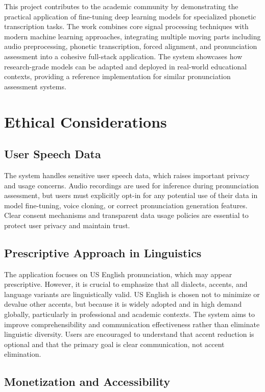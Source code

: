 \documentclass[a4paper,12pt]{report}
\begin{document}
This project contributes to the academic community by demonstrating the practical application of fine-tuning deep learning models for specialized phonetic transcription tasks. The work combines core signal processing techniques with modern machine learning approaches, integrating multiple moving parts including audio preprocessing, phonetic transcription, forced alignment, and pronunciation assessment into a cohesive full-stack application. The system showcases how research-grade models can be adapted and deployed in real-world educational contexts, providing a reference implementation for similar pronunciation assessment systems.

\section{Ethical Considerations}

\subsection{User Speech Data}

The system handles sensitive user speech data, which raises important privacy and usage concerns. Audio recordings are used for inference during pronunciation assessment, but users must explicitly opt-in for any potential use of their data in model fine-tuning, voice cloning, or correct pronunciation generation features. Clear consent mechanisms and transparent data usage policies are essential to protect user privacy and maintain trust.

\subsection{Prescriptive Approach in Linguistics}

The application focuses on US English pronunciation, which may appear prescriptive. However, it is crucial to emphasize that all dialects, accents, and language variants are linguistically valid. US English is chosen not to minimize or devalue other accents, but because it is widely adopted and in high demand globally, particularly in professional and academic contexts. The system aims to improve comprehensibility and communication effectiveness rather than eliminate linguistic diversity. Users are encouraged to understand that accent reduction is optional and that the primary goal is clear communication, not accent elimination.

\subsection{Monetization and Accessibility}
\end{document}
